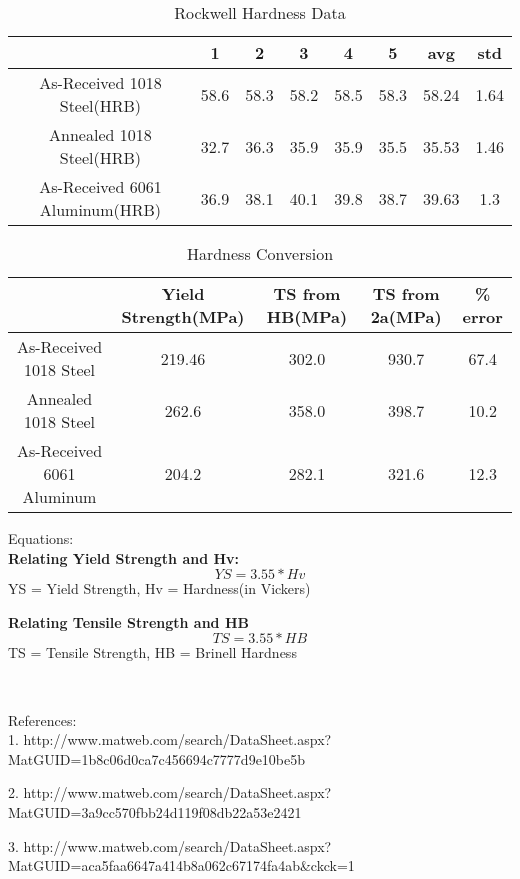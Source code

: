 \documentclass{article}
\begin{document}
\begin{table}[h]
\centering
\caption{Rockwell Hardness Data}
\begin{tabular}{||c | c | c | c | c | c | c | c||}
	\hline
	\ 	&
	1 & 2 & 3 & 4 & 5 & avg & std\\
	\hline\hline
	As-Received 1018 Steel(HRB)		&
	58.6	&	58.3	&	58.2	&	58.5	&	58.3 & 58.24	& 1.64\\
	Annealed 1018 Steel(HRB)		&
	32.7	&	36.3	&	35.9	&	35.9	&	35.5 & 35.53 	& 1.46\\
	As-Received 6061 Aluminum(HRB)	&
	36.9	&	38.1	&	40.1	&	39.8	&	38.7 & 39.63 & 1.3\\
	\hline
\end{tabular}
\end{table}

\begin{table}[h]
\centering
\caption{Hardness Conversion}
\begin{tabular}{||c | c | c | c | c||}
	\hline
	\ 	&
	Yield Strength(MPa) & TS from HB(MPa) & TS from 2a(MPa) & \% error\\
	\hline\hline
	As-Received 1018 Steel		&
	219.46	& 302.0	& 930.7 & 67.4\\
	Annealed 1018 Steel		&
	262.6	& 358.0	& 398.7 & 10.2\\
	As-Received 6061 Aluminum	&
	204.2	& 282.1 & 321.6 & 12.3\\
	\hline
\end{tabular}
\end{table}

Equations:\\

\textbf{Relating Yield Strength and Hv:}
\begin{equation}
YS = 3.55 * Hv
\end{equation}
YS = Yield Strength, Hv = Hardness(in Vickers)

\textbf{Relating Tensile Strength and HB}
\begin{equation}
TS = 3.55 * HB
\end{equation}
TS = Tensile Strength, HB = Brinell Hardness

\ 

References:\\

1.	http://www.matweb.com/search/DataSheet.aspx?MatGUID=1b8c06d0ca7c456694c7777d9e10be5b

2.	http://www.matweb.com/search/DataSheet.aspx?MatGUID=3a9cc570fbb24d119f08db22a53e2421 

3.	http://www.matweb.com/search/DataSheet.aspx?MatGUID=aca5faa6647a414b8a062c67174fa4ab\&ckck=1 
\end{document}
